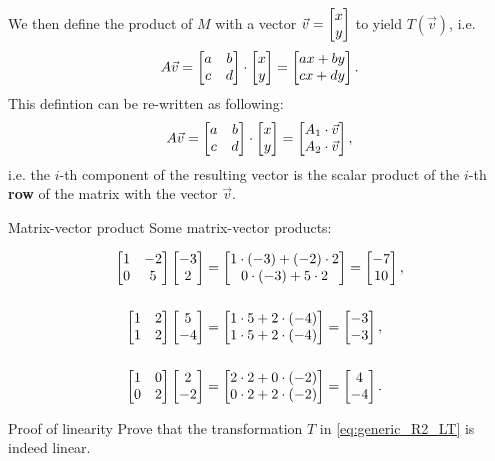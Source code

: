 We then define the product of $M$ with a vector $\vec{v}=\colvec{x;y}$ to yield $T \left( \vec{v} \right)$, i.e.
\begin{equation}
	A\vec{v} = \begin{bmatrix} a&b\\c&d \end{bmatrix} \cdot\colvec{x;y} = \colvec{ax+by;cx+dy}.
	\label{eq:matrix_vector_product}
\end{equation}
This defintion can be re-written as following:
\begin{equation}
	A\vec{v} = \begin{bmatrix} a&b\\c&d \end{bmatrix} \cdot\colvec{x;y} = \colvec{A_{1}\cdot\vec{v};A_{2}\cdot\vec{v}},
	\label{eq:matrix_vector_product_as_dot_product}
\end{equation}
i.e. the $i$-th component of the resulting vector is the scalar product of the $i$-th \textbf{row} of the matrix with the vector $\vec{v}$.

\begin{example}{Matrix-vector product}{}
	Some matrix-vector products:

	\begin{align*}
		\begin{bmatrix}
			1 & -2 \\
			0 & 5
		\end{bmatrix}\colvec{-3;2} &= \colvec{1\cdot(-3) + (-2)\cdot2;0\cdot(-3)+5\cdot2} = \colvec{-7;10},\\[5mm]
		\begin{bmatrix}
			1 & 2 \\
			1 & 2
		\end{bmatrix}\colvec{5;-4} &= \colvec{1\cdot5+2\cdot(-4);1\cdot5+2\cdot(-4)} = \colvec{-3;-3},\\[5mm]
		\begin{bmatrix}
			1 & 0 \\
			0 & 2
		\end{bmatrix}\colvec{2;-2} &= \colvec{2\cdot2+0\cdot(-2);0\cdot2+2\cdot(-2)} = \colvec{4;-4}.
	\end{align*}
\end{example}

\begin{challange}{Proof of linearity}{}
	Prove that the transformation $T$ in \autoref{eq:generic_R2_LT} is indeed linear.
\end{challange}

